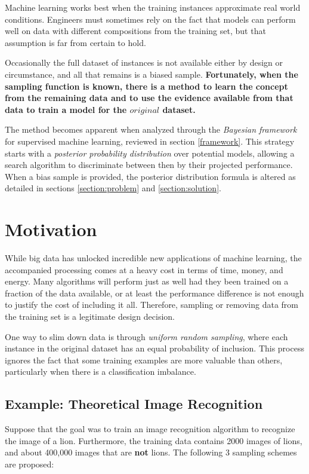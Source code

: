 \documentclass[twoside]{article}
\begin{document}
Machine learning works best when the training instances approximate real world conditions. Engineers must sometimes rely on the fact that models can perform well on data with different compositions from the training set, but that assumption is far from certain to hold.

Occasionally the full dataset of instances is not available either by design or circumstance, and all that remains is a biased sample. \textbf{Fortunately, when the sampling function is known, there is a method to learn the concept from the remaining data and to use the evidence available from that data to train a model for the \(original\) dataset.}

The method becomes apparent when analyzed through the \textit{Bayesian framework} for supervised machine learning, reviewed in section \ref{framework}. This strategy starts with a \textit{posterior probability distribution} over potential models, allowing a search algorithm to discriminate between then by their projected performance. When a bias sample is provided, the posterior distribution formula is altered as detailed in sections \ref{section:problem} and \ref{section:solution}.

\section{Motivation}

While big data has unlocked incredible new applications of machine learning, the accompanied processing comes at a heavy cost in terms of time, money, and energy. Many algorithms will perform just as well had they been trained on a fraction of the data available, or at least the performance difference is not enough to justify the cost of including it all. Therefore, sampling or removing data from the training set is a legitimate design decision.

One way to slim down data is through \textit{uniform random sampling}, where each instance in the original dataset has an equal probability of inclusion. This process ignores the fact that some training examples are more valuable than others, particularly when there is a classification imbalance.

\subsection{Example: Theoretical Image Recognition}
\label{section:lion}

Suppose that the goal was to train an image recognition algorithm to recognize the image of a lion. Furthermore, the training data contains 2000 images of lions, and about 400,000 images that are \textbf{not} lions. The following 3 sampling schemes are proposed:
\end{document}
